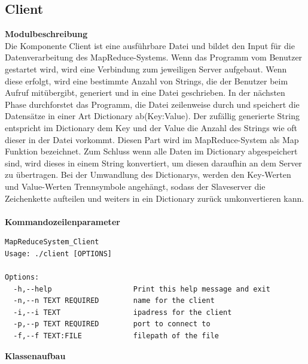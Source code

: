 \documentclass[a4paper,12pt]{article}
\begin{document}
\subsection{Client}
\textbf{Modulbeschreibung}\\
Die Komponente Client ist eine ausführbare Datei und bildet den Input für die Datenverarbeitung des MapReduce-Systems. Wenn das Programm vom Benutzer gestartet wird, wird eine Verbindung zum jeweiligen Server aufgebaut. Wenn diese erfolgt, wird eine bestimmte Anzahl von Strings, 
die der Benutzer beim Aufruf mitübergibt, generiert und in eine Datei geschrieben. In der nächsten Phase durchforstet das Programm, die Datei zeilenweise durch und speichert die Datensätze in einer Art Dictionary ab(Key:Value). Der zufällig generierte String entspricht im Dictionary dem Key und der Value die Anzahl des Strings wie oft dieser in der Datei vorkommt.
Diesen Part wird im MapReduce-System als Map Funktion bezeichnet. Zum Schluss wenn alle Daten im Dictionary abgespeichert sind, wird dieses in einem
String konvertiert, um diesen daraufhin an dem Server zu übertragen. Bei der Umwandlung des Dictionarys, werden den Key-Werten und Value-Werten Trennsymbole angehängt, sodass der Slaveserver die Zeichenkette aufteilen und weiters in ein Dictionary zurück umkonvertieren kann.\\\\
\textbf{Kommandozeilenparameter}\\
\begin{verbatim}
MapReduceSystem_Client
Usage: ./client [OPTIONS]

Options:
  -h,--help                   Print this help message and exit
  -n,--n TEXT REQUIRED        name for the client
  -i,--i TEXT                 ipadress for the client
  -p,--p TEXT REQUIRED        port to connect to
  -f,--f TEXT:FILE            filepath of the file

\end{verbatim}
\newpage
\textbf{Klassenaufbau}\\
\end{document}

